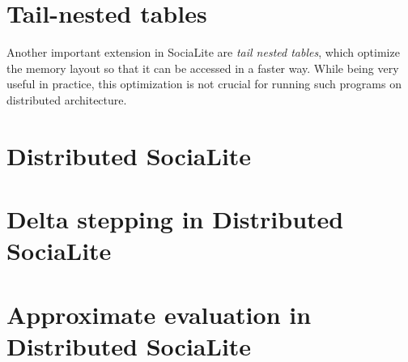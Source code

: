 \section{Tail-nested tables}\label{s:tnt}
Another important extension in SociaLite are \emph{tail nested tables}, which optimize the memory layout so that it can be accessed in a faster way. While being very useful in practice, this optimization is not crucial for running such programs on distributed architecture. 

\section{Distributed SociaLite}\label{s:distributed}

\section{Delta stepping in Distributed SociaLite}\label{s:deltastep}

\section{Approximate evaluation in Distributed SociaLite}\label{s:approxdist}




